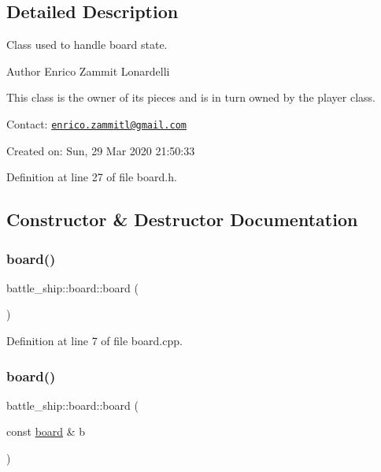 \subsection{Detailed Description}
Class used to handle board state. 

\begin{DoxyAuthor}{Author}
Enrico Zammit Lonardelli
\end{DoxyAuthor}
This class is the owner of its pieces and is in turn owned by the player class.

Contact\+: \href{mailto:enrico.zammitl@gmail.com}{\tt enrico.\+zammitl@gmail.\+com}

Created on\+: Sun, 29 Mar 2020 21\+:50\+:33 

Definition at line 27 of file board.\+h.



\subsection{Constructor \& Destructor Documentation}
\mbox{\label{classbattle__ship_1_1board_a4d561505fe0c5d355e70bbd2bde1b00e}} 
\subsubsection{\texorpdfstring{board()}{board()}\hspace{0.1cm}{\footnotesize\ttfamily [1/3]}}
{\footnotesize\ttfamily battle\+\_\+ship\+::board\+::board (\begin{DoxyParamCaption}{ }\end{DoxyParamCaption})}



Definition at line 7 of file board.\+cpp.

\mbox{\label{classbattle__ship_1_1board_a72bdef4b84b4c2d8241b4307cae2cb9e}} 
\subsubsection{\texorpdfstring{board()}{board()}\hspace{0.1cm}{\footnotesize\ttfamily [2/3]}}
{\footnotesize\ttfamily battle\+\_\+ship\+::board\+::board (\begin{DoxyParamCaption}\item[{const \hyperlink{classbattle__ship_1_1board}{board} \&}]{b }\end{DoxyParamCaption})}



